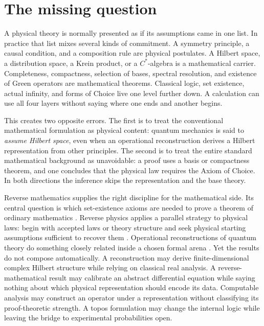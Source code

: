 \documentclass[11pt]{article}
\theoremstyle{definition}
\theoremstyle{remark}
\begin{document}
\section{The missing question}
\label{sec:introduction}

A physical theory is normally presented as if its assumptions came in one
list.  In practice that list mixes several kinds of commitment.  A symmetry
principle, a causal condition, and a composition rule are physical
postulates.  A Hilbert space, a distribution space, a Krein product, or a
\(C^*\)-algebra is a mathematical carrier.  Completeness, compactness,
selection of bases, spectral resolution, and existence of Green operators are
mathematical theorems.  Classical logic, set existence, actual infinity, and
forms of Choice live one level further down.  A calculation can use all four
layers without saying where one ends and another begins.

This creates two opposite errors.  The first is to treat the conventional
mathematical formulation as physical content: quantum mechanics is said to
\emph{assume Hilbert space}, even when an operational reconstruction derives a
Hilbert representation from other principles.  The second is to treat the
entire standard mathematical background as unavoidable: a proof uses a basis
or compactness theorem, and one concludes that the physical law requires the
Axiom of Choice.  In both directions the inference skips the representation
and the base theory.

Reverse mathematics supplies the right discipline for the mathematical side.
Its central question is which set-existence axioms are needed to prove a
theorem of ordinary mathematics \cite{Simpson2009}.  Reverse physics applies a
parallel strategy to physical laws: begin with accepted laws or theory
structure and seek physical starting assumptions sufficient to recover them
\cite{CarcassiAidala2022}.  Operational reconstructions of quantum theory do
something closely related inside a chosen formal arena
\cite{Hardy2001,Chiribella2011}.  Yet the results do not compose
automatically.  A reconstruction may derive finite-dimensional complex
Hilbert structure while relying on classical real analysis.  A reverse-
mathematical result may calibrate an abstract differential equation while
saying nothing about which physical representation should encode its data.
Computable analysis may construct an operator under a representation without
classifying its proof-theoretic strength.  A topos formulation may change the
internal logic while leaving the bridge to experimental probabilities open.
\end{document}
